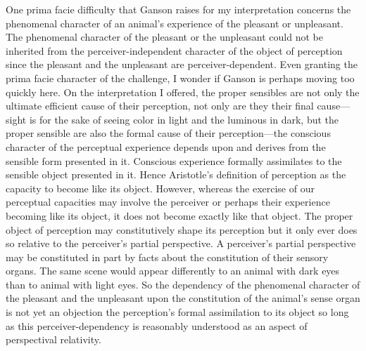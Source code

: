 \documentclass[12pt]{article}
\begin{document}
One prima facie difficulty that Ganson raises for my interpretation concerns the phenomenal character of an animal's experience of the pleasant or unpleasant. The phenomenal character of the pleasant or the unpleasant could not be inherited from the perceiver-independent character of the object of perception since the pleasant and the unpleasant are perceiver-dependent. Even granting the prima facie character of the challenge, I wonder if Ganson is perhaps moving too quickly here. On the interpretation I offered, the proper sensibles are not only the ultimate efficient cause of their perception, not only are they their final cause---sight is for the sake of seeing color in light and the luminous in dark, but the proper sensible are also the formal cause of their perception---the conscious character of the perceptual experience depends upon and derives from the sensible form presented in it. Conscious experience formally assimilates to the sensible object presented in it. Hence Aristotle's definition of perception as the capacity to become like its object. However, whereas the exercise of our perceptual capacities may involve the perceiver or perhaps their experience becoming like its object, it does not become exactly like that object. The proper object of perception may constitutively shape its perception but it only ever does so relative to the perceiver's partial perspective. A perceiver's partial perspective may be constituted in part by facts about the constitution of their sensory organs. The same scene would appear differently to an animal with dark eyes than to animal with light eyes. So the dependency of the phenomenal character of the pleasant and the unpleasant upon the constitution of the animal's sense organ is not yet an objection the perception's formal assimilation to its object so long as this perceiver-dependency is reasonably understood as an aspect of perspectival relativity.
\end{document}
